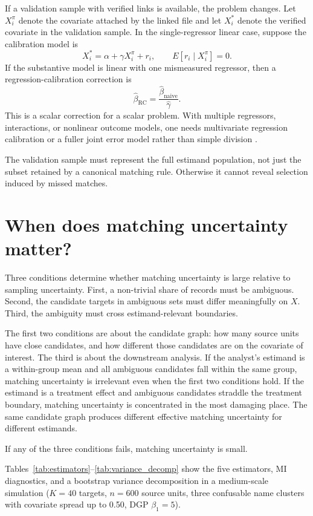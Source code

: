 \documentclass[12pt]{article}
\theoremstyle{remark}
\begin{document}
If a validation sample with verified links is available, the problem changes. Let $X_i^\pi$ denote the covariate attached by the linked file and let $X_i^*$ denote the verified covariate in the validation sample. In the single-regressor linear case, suppose the calibration model is
\[
X_i^*=\alpha+\gamma X_i^\pi+r_i,\qquad E[r_i\mid X_i^\pi]=0.
\]
If the substantive model is linear with one mismeasured regressor, then a regression-calibration correction is
\[
\hat\beta_{\mathrm{RC}}=\frac{\hat\beta_{\mathrm{naive}}}{\hat\gamma}.
\]
This is a scalar correction for a scalar problem. With multiple regressors, interactions, or nonlinear outcome models, one needs multivariate regression calibration or a fuller joint error model rather than simple division \citep{carroll2006}.

The validation sample must represent the full estimand population, not just the subset retained by a canonical matching rule. Otherwise it cannot reveal selection induced by missed matches.

\section{When does matching uncertainty matter?}

Three conditions determine whether matching uncertainty is large relative to sampling uncertainty. First, a non-trivial share of records must be ambiguous. Second, the candidate targets in ambiguous sets must differ meaningfully on $X$. Third, the ambiguity must cross estimand-relevant boundaries.

The first two conditions are about the candidate graph: how many source units have close candidates, and how different those candidates are on the covariate of interest. The third is about the downstream analysis. If the analyst's estimand is a within-group mean and all ambiguous candidates fall within the same group, matching uncertainty is irrelevant even when the first two conditions hold. If the estimand is a treatment effect and ambiguous candidates straddle the treatment boundary, matching uncertainty is concentrated in the most damaging place. The same candidate graph produces different effective matching uncertainty for different estimands.

If any of the three conditions fails, matching uncertainty is small.

Tables~\ref{tab:estimators}--\ref{tab:variance_decomp} show the five estimators, MI diagnostics, and a bootstrap variance decomposition in a medium-scale simulation ($K=40$ targets, $n=600$ source units, three confusable name clusters with covariate spread up to 0.50, DGP $\beta_1=5$).
\end{document}

